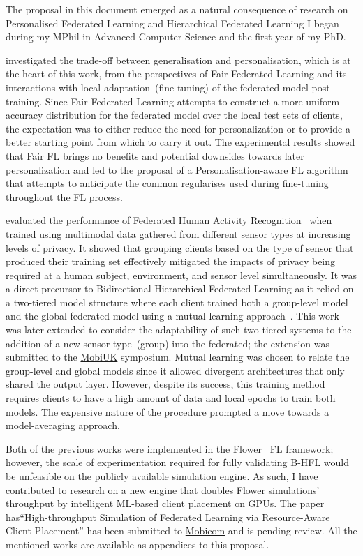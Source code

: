 The proposal in this document emerged as a natural consequence of research on Personalised Federated Learning and Hierarchical Federated Learning I began during my MPhil in Advanced Computer Science and the first year of my PhD.

\citet{EuroMLSysWorkshop} investigated the trade-off between generalisation and personalisation, which is at the heart of this work, from the perspectives of Fair Federated Learning and its interactions with local adaptation~(fine-tuning) of the federated model post-training. Since Fair Federated Learning attempts to construct a more uniform accuracy distribution for the federated model over the local test sets of clients, the expectation was to either reduce the need for personalization or to provide a better starting point from which to carry it out. The experimental results showed that Fair FL brings no benefits and potential downsides towards later personalization and led to the proposal of a Personalisation-aware FL algorithm that attempts to anticipate the common regularises used during fine-tuning throughout the FL process.

\citet{OperaWorkshop} evaluated the performance of Federated Human Activity Recognition~\citep{HARusingFL_2018} when trained using multimodal data gathered from different sensor types at increasing levels of privacy. It showed that grouping clients based on the type of sensor that produced their training set effectively mitigated the impacts of privacy being required at a human subject, environment, and sensor level simultaneously. It was a direct precursor to Bidirectional Hierarchical Federated Learning as it relied on a two-tiered model structure where each client trained both a group-level model and the global federated model using a mutual learning approach~\citep{DeepMutualLearning}. This work was later extended to consider the adaptability of such two-tiered systems to the addition of a new sensor type~(group) into the federated; the extension was submitted to the \href{https://mobiuk.org/2023}{MobiUK} symposium. Mutual learning was chosen to relate the group-level and global models since it allowed divergent architectures that only shared the output layer. However, despite its success, this training method requires clients to have a high amount of data and local epochs to train both models. The expensive nature of the procedure prompted a move towards a model-averaging approach.

Both of the previous works were implemented in the Flower~\citep{Flower} FL framework; however, the scale of experimentation required for fully validating B-HFL would be unfeasible on the publicly available simulation engine. As such, I have contributed to research on a new engine that doubles Flower simulations' throughput by intelligent ML-based client placement on GPUs. The paper has``High-throughput Simulation of Federated Learning via Resource-Aware Client Placement'' has been submitted to \href{https://sigmobile.org/mobicom/2023/}{Mobicom} and is pending review. All the mentioned works are available as appendices to this proposal.

